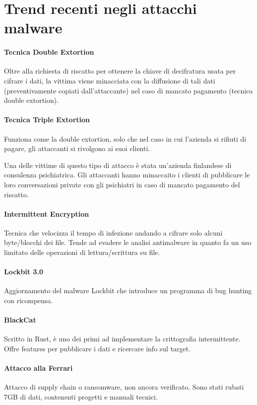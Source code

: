 \section{Trend recenti negli attacchi malware}
\paragraph{Tecnica Double Extortion} Oltre alla richiesta di riscatto per ottenere la chiave di decifratura usata per cifrare i dati, la vittima viene minacciata con la diffusione di tali dati (preventivamente copiati dall'attaccante) nel caso di mancato pagamento (tecnica double extortion). 

\paragraph{Tecnica Triple Extortion} Funziona come la double extortion, solo che nel caso in cui l'azienda si rifiuti di pagare, gli attaccanti si rivolgono ai suoi clienti.

Una delle vittime di questo tipo di attacco è stata un'azienda finlandese di consulenza psichiatrica. Gli attaccanti hanno minaccaito i clienti di pubblicare le loro conversazioni private con gli psichiatri in caso di mancato pagamento del riscatto.

\paragraph{Intermittent Encryption} Tecnica che velocizza il tempo di infezione andando a cifrare solo alcuni byte/blocchi dei file. Tende ad evadere le analisi antimalware in quanto fa un uso limitato delle operazioni di lettura/scrittura su file.

\paragraph{Lockbit 3.0} Aggiornamento del malware Lockbit che introduce un programma di bug hunting con ricompensa.

\paragraph{BlackCat} Scritto in Rust, è uno dei primi ad implementare la crittografia intermittente. Offre features per pubblicare i dati e ricercare info sul target.

\paragraph{Attacco alla Ferrari} Attacco di supply chain o ransomware, non ancora verificato. Sono stati rubati 7GB di dati, contenenti progetti e manuali tecnici.

